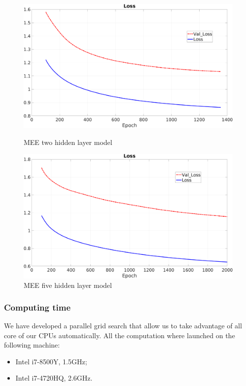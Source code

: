 \vspace{0.5cm}
\begin{figure}[H]
	\centering
	\begin{minipage}[t]{0.5\linewidth}
		\includegraphics[width=\linewidth]{img/Cup_loss_Reg_Zoom_2l.png}
		\caption{MEE two hidden layer model}
		\label{img::twolayer}
	\end{minipage}%
	\begin{minipage}[t]{0.5\linewidth}
		\includegraphics[width=\linewidth]{img/Cup_loss_Reg_Zoom_5l.png}
		\caption{MEE five hidden layer model}
		\label{img::fivelayer}
	\end{minipage}
\end{figure}

\subsubsection{Computing time}
We have developed a parallel grid search that allow us to take advantage of all core of our CPUs automatically. All the computation where launched on the following machine:
\begin{itemize}
	\item Intel i7-8500Y, 1.5GHz;
	\item Intel i7-4720HQ, 2.6GHz.
	
\end{itemize}

